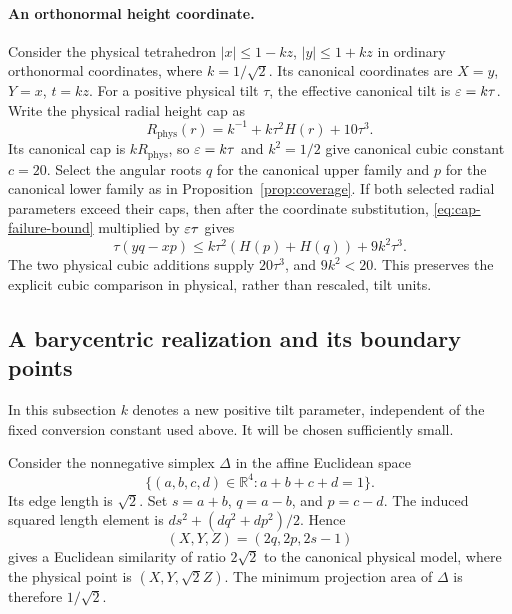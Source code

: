 \paragraph{An orthonormal height coordinate.}
Consider the physical tetrahedron $|x|\le1-kz$, $|y|\le1+kz$ in
ordinary orthonormal coordinates, where $k=1/\sqrt2$. Its canonical
coordinates are $X=y$, $Y=x$, $t=kz$. For a positive physical tilt
$\tau$, the effective canonical tilt is $\varepsilon=k\tau$.
Write the physical radial height cap as
\[
 R_{\mathrm{phys}}(r)=k^{-1}+k\tau^2H(r)+10\tau^3.
\]
Its canonical cap is $kR_{\mathrm{phys}}$, so $\varepsilon=k\tau$ and
$k^2=1/2$ give canonical cubic constant $c=20$.
Select the angular roots $q$ for the canonical upper family and $p$ for
the canonical lower family as in Proposition~\ref{prop:coverage}.
If both selected radial parameters exceed their caps, then after the
coordinate substitution, \eqref{eq:cap-failure-bound} multiplied by
$\varepsilon\tau$ gives
\[
 \tau(yq-xp)\le k\tau^2(H(p)+H(q))+9k^2\tau^3.
\]
The two physical cubic additions supply $20\tau^3$, and $9k^2<20$.
This preserves the explicit cubic comparison in physical, rather than
rescaled, tilt units.

\subsection{A barycentric realization and its boundary points}

In this subsection $k$ denotes a new positive tilt parameter, independent
of the fixed conversion constant used above. It will be chosen sufficiently
small.

Consider the nonnegative simplex $\Delta$ in the affine Euclidean space
\[
 \{(a,b,c,d)\in\mathbb R^4:a+b+c+d=1\}.
\]
Its edge length is $\sqrt2$. Set $s=a+b$, $q=a-b$, and $p=c-d$.
The induced squared length element is
$ds^2+(dq^2+dp^2)/2$. Hence
\begin{equation}\label{eq:barycentric-dictionary}
 (X,Y,Z)=(2q,2p,2s-1)
\end{equation}
gives a Euclidean similarity of ratio $2\sqrt2$ to the canonical
physical model, where the physical point is $(X,Y,\sqrt2 Z)$.
The minimum projection area of $\Delta$ is therefore $1/\sqrt2$.


